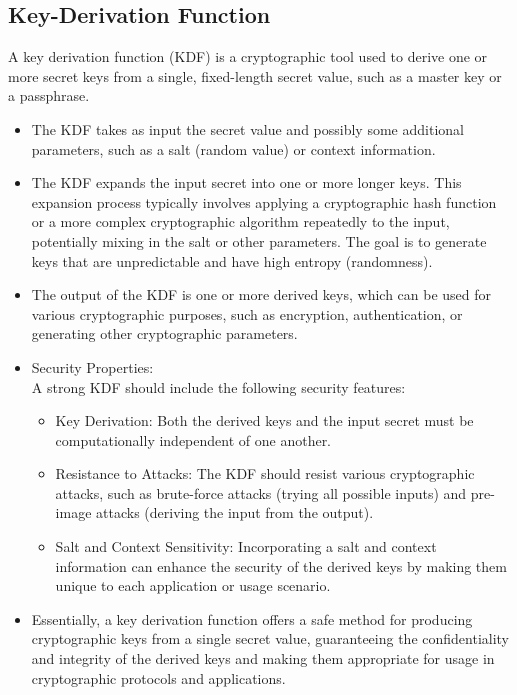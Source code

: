 \documentclass[10pt,oneside,english,a4paper]{article}
\begin{document}
\subsection{Key-Derivation Function}
A key derivation function (KDF) is a cryptographic tool used to derive one or more secret keys from a single, fixed-length secret value, such as a master key or a passphrase.
\begin{itemize}
\item The KDF takes as input the secret value and possibly some additional parameters, such as a salt (random value) or context information.
\item The KDF expands the input secret into one or more longer keys. This expansion process typically involves applying a cryptographic hash function or a more complex cryptographic algorithm repeatedly to the input, potentially mixing in the salt or other parameters. The goal is to generate keys that are unpredictable and have high entropy (randomness).
\item The output of the KDF is one or more derived keys, which can be used for various cryptographic purposes, such as encryption, authentication, or generating other cryptographic parameters.

\item Security Properties: \\
A strong KDF should include the following security features:
	\begin{itemize}        
		\item Key Derivation: Both the derived keys and the input secret must be computationally independent of one another.
	        \item Resistance to Attacks: The KDF should resist various cryptographic attacks, such as brute-force attacks (trying all possible inputs) and pre-image attacks (deriving the input from the output).
	        \item Salt and Context Sensitivity: Incorporating a salt and context information can enhance the security of the derived keys by making them unique to each application or usage scenario.
	\end{itemize}

\item Essentially, a key derivation function offers a safe method for producing cryptographic keys from a single secret value, guaranteeing the confidentiality and integrity of the derived keys and making them appropriate for usage in cryptographic protocols and applications.
\end{itemize}
\end{document}
